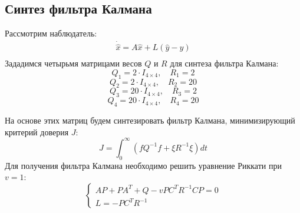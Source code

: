\subsection{Синтез фильтра Калмана}
Рассмотрим наблюдатель:
\begin{equation}
    \begin{array}{ll}
        \dot{\hat{x}} = A\hat{x} + L(\hat{y} - y) \\
    \end{array}
\end{equation}
Зададимся четырьмя матрицами весов $Q$ и $R$ для синтеза фильтра Калмана:
\begin{equation}
    Q_1 = 2\cdot I_{4\times4}, \quad
    R_1 = 2
\end{equation}
\begin{equation}
    Q_2 = 2\cdot I_{4\times4}, \quad
    R_2 = 20
\end{equation}
\begin{equation}
    Q_3 = 20\cdot I_{4\times4}, \quad
    R_3 = 2
\end{equation}
\begin{equation}
    Q_4 = 20\cdot I_{4\times4}, \quad
    R_4 = 20
\end{equation}

На основе этих матриц будем синтезировать фильтр Калмана, минимизирующий критерий доверия $J$:
\begin{equation}
    J = \int_0^\infty \left( fQ^{-1}f + \xi R^{-1}\xi \right) dt
\end{equation}
Для получения фильтра Калмана необходимо решить уравнение Риккати при $v = 1$: 
\begin{equation}
    \begin{cases}
        AP + PA^T + Q - vPC^TR^{-1}CP = 0 \\
        L = -PC^TR^{-1}
    \end{cases}
\end{equation}

